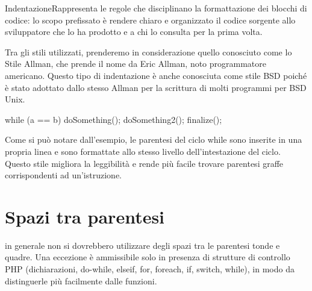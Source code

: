 \begin{deftab}{Indentazione}{Rappresenta le regole che disciplinano la formattazione dei blocchi di codice: lo scopo prefissato è rendere chiaro e organizzato il codice sorgente allo sviluppatore che lo ha prodotto e a chi lo consulta per la prima volta.}
\end{deftab}

Tra gli stili utilizzati, prenderemo in considerazione quello conosciuto come lo Stile Allman, che prende il nome da Eric Allman, noto programmatore americano. Questo tipo di indentazione è anche conosciuta come stile BSD poiché è stato adottato dallo stesso Allman per la scrittura di molti programmi per BSD Unix.

\begin{code}
while (a == b)
  {
      doSomething();
      doSomething2();
  }
  finalize();
\end{code}

Come si può notare dall'esempio, le parentesi del ciclo while sono inserite in una propria linea e sono formattate allo stesso livello dell'intestazione del ciclo. Questo stile migliora la leggibilità e rende più facile trovare parentesi graffe corrispondenti ad un'istruzione.


\section*{Spazi tra parentesi}
in generale non si dovrebbero utilizzare degli spazi tra le parentesi tonde e quadre. Una eccezione è ammissibile solo in presenza di strutture di controllo \ac{PHP} (dichiarazioni, do-while, elseif, for, foreach, if, switch, while), in modo da distinguerle più facilmente dalle funzioni.

